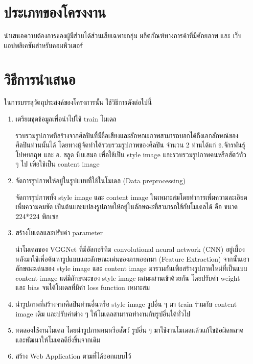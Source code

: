 \documentclass[12pt,oneside,openright,a4paper]{cpe-thai-project}
\begin{document}
\section{ประเภทของโครงงาน}
\par\setlength{\parindent}{5ex}นําเสนอความต้องการของผู้มีส่วนได้ส่วนเสียเฉพาะกลุ่ม ผลิตภัณฑ์ทางการค้าที่มีศักยภาพ และ เว็บแอปพลิเคชันสำหรับคอมพิวเตอร์

\section{วิธีการนำเสนอ}
\par\setlength{\parindent}{5ex}ในการบรรลุวัตถุประสงค์ของโครงการนั้น ใช้วิธีการดังต่อไปนี้
\begin{enumerate}
\item เตรียมชุดข้อมูลเพื่อนำไปใช้ train โมเดล\par\setlength{\parindent}{5ex}รวบรวมรูปภาพที่สร้างจากศิลปินที่มีชื่อเสียงและลักษณะภาพสามารถบอกได้ถึงเอกลักษณ์ของศิลปินท่านนั้นได้ โดยทางผู้จัดทำได้รวบรวมรูปภาพของศิลปิน จำนวน 2 ท่านได้แก่ อ.จักรพันธุ์ โปษยกฤษ และ อ. ชลูด นิ่มเสมอ เพื่อใช้เป็น style image และรวบรวมรูปภาพคนหรือสัตว์ทั่ว ๆ ไป เพื่อใช้เป็น content image
\item จัดการรูปภาพให้อยู่ในรูปแบบที่ใช้ในโมเดล (Data preprocessing)\par\setlength{\parindent}{5ex} จัดการรูปภาพทั้ง style image และ content image ในเหมาะสมโดยทำการเพิ่มความละเอียด เพิ่มความคมชัด เป็นต้นและแปลงรูปภาพให้อยู่ในลักษณะที่สามารถใช้กับโมเดลได้ คือ ขนาด 224*224 พิกเซล
\item สร้างโมเดลและปรับค่า parameter \par\setlength{\parindent}{5ex}นำโมเดลของ VGGNet ที่มีอัลกอริทึม convolutional neural network (CNN) อยู่เบื้องหลังมาใช้เพื่อค้นหารูปแบบและลักษณะเด่นของภาพออกมา (Feature Extraction) จากนั้นเอาลักษณะเด่นของ style image และ content image มารวมกันเพื่อสร้างรูปภาพใหม่ที่เป็นแบบ content image แต่มีลักษณะของ style  image ผสมผสานเข้าด้วยกัน โดยปรับค่า weight และ bias จนได้โมเดลที่มีค่า loss function เหมาะสม
\item นำรูปภาพที่สร้างจากศิลปินท่านอื่นหรือ style image รูปอื่น ๆ มา train ร่วมกับ content image เดิม และปรับค่าต่าง ๆ ให้โมเดลสามารถทำงานกับรูปอื่นได้ทั่วไป
\item ทดลองใช้งานโมเดล โดยนำรูปภาพคนหรือสัตว์ รูปอื่น ๆ มาใช้งานโมเดลแล้วแก้ไขข้อผิดพลาดและพัฒนาให้โมเดลดียิ่งขึ้นจากเดิม
\item สร้าง Web Application ตามที่ได้ออกแบบไว้
\end{enumerate}
\end{document}
